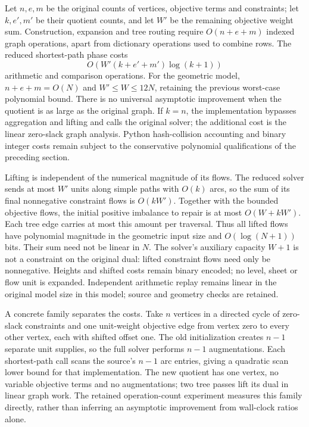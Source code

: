 Let $n,e,m$ be the original counts of vertices, objective terms and constraints;
let $k,e',m'$ be their quotient counts, and let $W'$ be the remaining objective
weight sum. Construction, expansion and tree routing require
$O(n+e+m)$ indexed graph operations, apart from dictionary operations used to
combine rows. The reduced shortest-path phase costs
\[
 O\!\left(W'(k+e'+m')\log(k+1)\right)
\]
arithmetic and comparison operations. For the geometric model,
$n+e+m=O(N)$ and $W'\leq W\leq12N$, retaining the previous worst-case polynomial
bound. There is no universal asymptotic improvement when the quotient is as
large as the original graph. If $k=n$, the implementation bypasses aggregation
and lifting and calls the original solver; the additional cost is the linear
zero-slack graph analysis. Python hash-collision accounting and binary integer
costs remain subject to the conservative polynomial qualifications of the
preceding section.

Lifting is independent of the numerical magnitude of its flows. The reduced
solver sends at most $W'$ units along simple paths with $O(k)$ arcs, so the sum
of its final nonnegative constraint flows is $O(kW')$. Together with the bounded
objective flows, the initial positive imbalance to repair is at most
$O(W+kW')$. Each tree edge carries at most this amount per traversal. Thus
all lifted flows have polynomial magnitude in the geometric input size and
$O(\log(N+1))$ bits. Their sum need not be linear in $N$. The
solver's auxiliary capacity $W+1$ is not a constraint on the original dual:
lifted constraint flows need only be nonnegative.
Heights and shifted costs remain binary encoded; no level, sheet or flow unit
is expanded. Independent arithmetic replay remains linear in the original model size
in this model; source and geometry checks are retained.

A concrete family separates the costs. Take $n$ vertices in a directed cycle
of zero-slack constraints and one unit-weight objective edge from vertex zero
to every other vertex, each with shifted offset one. The old initialization
creates $n-1$ separate unit supplies, so the full solver performs $n-1$
augmentations. Each shortest-path call scans the source's $n-1$ arc entries,
giving a quadratic scan lower bound for that implementation. The new quotient
has one vertex, no variable objective terms and no augmentations; two tree
passes lift its dual in linear graph work. The retained operation-count
experiment measures this family directly, rather than inferring an
asymptotic improvement from wall-clock ratios alone.


